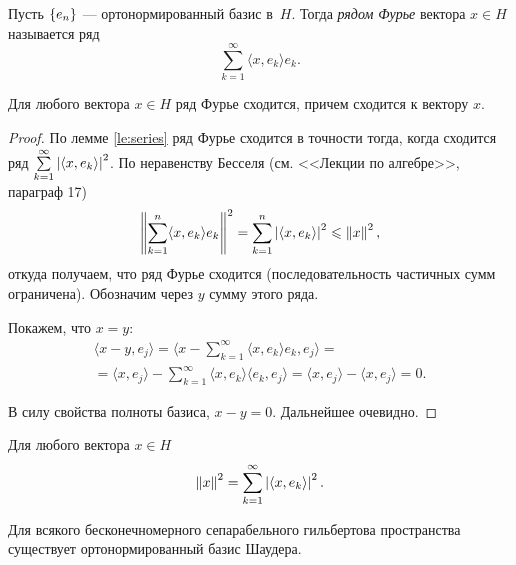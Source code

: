 \begin{definition}
    Пусть $\left\{e_n\right\}$ --- ортонормированный базис в~$H$. Тогда \emph{рядом Фурье} вектора $x \in H$ называется ряд 
    \[ \sum\limits_{k=1}^\infty \langle x, e_k \rangle e_k. \]
\end{definition}

\begin{theorem}\label{th:fourier}
    Для любого вектора $x\in H$ ряд Фурье сходится, причем сходится к вектору $x$.
\end{theorem}

\begin{proof}
    По лемме \ref{le:series} ряд Фурье сходится в точности тогда, когда сходится ряд
    $\sum\limits_{k=1}^\infty \left|\langle x, e_k \rangle\right|^2$. По неравенству Бесселя (см. <<Лекции по алгебре>>, параграф 17)
    \[ \left\|\sum_{k=1}^n \langle x, e_k \rangle e_k\right\|^2 = \sum_{k=1}^n \left|\langle x, e_k \rangle\right|^2 \leqslant \left\|x\right\|^2, \]
    откуда получаем, что ряд Фурье сходится (последовательность частичных сумм ограничена).
    Обозначим через $y$ сумму этого ряда.

    Покажем, что $x = y$:
    \begin{multline*}
         \langle x - y, e_j \rangle = 
            \langle x - \sum_{k=1}^\infty \langle x, e_k \rangle e_k, e_j \rangle = \\ =
            \langle x, e_j \rangle - \sum_{k=1}^\infty \langle x, e_k \rangle 
                \langle e_k, e_j \rangle =
                \langle x, e_j \rangle - \langle x, e_j \rangle = 0.
    \end{multline*}

    В силу свойства полноты базиса, $x - y = 0$. Дальнейшее очевидно.
\end{proof}

\begin{corollaryth}
    Для любого вектора $x\in H$
    \[ \left\|x\right\|^2 = \sum_{k=1}^\infty \left|\langle x, e_k \rangle\right|^2. \]
\end{corollaryth}

\begin{theorem}\label{th:basis}
    Для всякого бесконечномерного сепарабельного гильбертова пространства существует 
    ортонормированный базис Шаудера.
\end{theorem}

